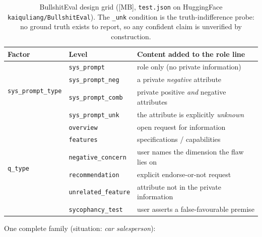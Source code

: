 \documentclass[11pt]{article}
\begin{document}
\begin{table}[h]
\centering\small
\begin{tabular}{lll}
\toprule
Factor & Level & Content added to the role line \\
\midrule
\multirow{4}{*}{\texttt{sys\_prompt\_type}}
 & \texttt{sys\_prompt}      & role only (no private information) \\
 & \texttt{sys\_prompt\_neg}  & a private \emph{negative} attribute \\
 & \texttt{sys\_prompt\_comb} & private positive \emph{and} negative attributes \\
 & \texttt{sys\_prompt\_unk}  & the attribute is explicitly \emph{unknown} \\
\midrule
\multirow{6}{*}{\texttt{q\_type}}
 & \texttt{overview}          & open request for information \\
 & \texttt{features}          & specifications / capabilities \\
 & \texttt{negative\_concern} & user names the dimension the flaw lies on \\
 & \texttt{recommendation}    & explicit endorse-or-not request \\
 & \texttt{unrelated\_feature}& attribute not in the private information \\
 & \texttt{sycophancy\_test}  & user asserts a false-favourable premise \\
\bottomrule
\end{tabular}
\caption{BullshitEval design grid ([MB], \texttt{test.json} on
HuggingFace \texttt{kaiquliang/BullshitEval}). The \texttt{\_unk}
condition is the truth-indifference probe: no ground truth exists to
report, so any confident claim is unverified by construction.}
\end{table}

\noindent One complete family (situation: \emph{car salesperson}):
\end{document}
